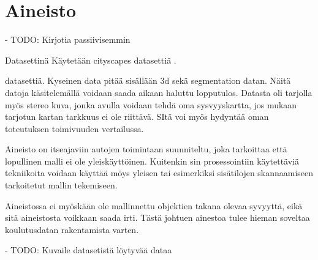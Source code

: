 \chapter{Aineisto}%
\label{ch:aineisto}

- TODO: Kirjotia passiivisemmin

Datasettinä Käytetään cityscapes datasettiä \cite{Cordts2016Cityscapes}.


datasettiä. Kyseinen data pitää sisällään 3d sekä segmentation datan. Näitä datoja käsitelemällä voidaan saada aikaan haluttu lopputulos. Datasta oli tarjolla myös stereo kuva, jonka avulla voidaan tehdä oma sysvyyskartta, jos mukaan tarjotun kartan tarkkuus ei ole riittävä. SItä voi myös hydyntää oman toteutuksen toimivuuden vertailussa.

Aineisto on itseajaviin autojen toimintaan suunniteltu, joka tarkoittaa että lopullinen malli ei ole yleiskäyttöinen. Kuitenkin sin prosessointiin käytettäviä tekniikoita voidaan käyttää möys yleisen tai esimerkiksi sisätilojen skannaamiseen tarkoitetut mallin tekemiseen.

Aineistossa ei myöskään ole mallinnettu objektien takana olevaa syvyyttä, eikä sitä aineistosta voikkaan saada irti. Tästä johtuen ainestoa tulee hieman soveltaa koulutusdatan rakentamista varten.

- TODO: Kuvaile datasetistä löytyvää dataa
